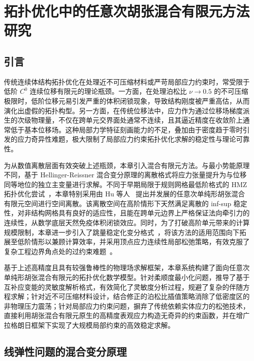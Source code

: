 \chapter{拓扑优化中的任意次胡张混合有限元方法研究}
\label{chap:hz_top}

\iffalse

\section{引言}
\label{sec:ch5_intro}

传统连续体结构拓扑优化在处理近不可压缩材料或严苛局部应力约束时，常受限于低阶 $C^0$ 连续位移有限元的理论瓶颈。一方面，在处理泊松比 $\nu \rightarrow 0.5$ 的不可压缩极限时，低阶位移元易引发严重的体积闭锁现象，导致结构刚度被严重高估，从而演化出虚假的拓扑构型。另一方面，在传统位移法中，应力作为通过位移场梯度派生的次级物理量，不仅在跨单元交界面处通常不连续，且其逼近精度在收敛阶上通常低于基本位移场。这种局部力学特征刻画能力的不足，叠加由于密度趋于零时引发的应力奇异性难题，极大限制了局部应力约束拓扑优化求解的稳定性与理论可靠性。

为从数值离散层面有效突破上述瓶颈，本章引入混合有限元方法。与最小势能原理不同，基于 Hellinger-Reissner 混合变分原理的离散格式将应力张量提升为与位移同等地位的独立主变量进行求解。不同于早期局限于规则网格最低阶格式的 HMZ 拓扑优化尝试~\cite{bruggiTopologyOptimizationMixed2016a}，本章特别采用由 Hu 等人~\cite{huFiniteElementApproximations2015} 提出并发展的任意次单纯形胡张混合有限元空间进行空间离散。该离散空间在高阶情形下天然满足离散的 inf-sup 稳定性，对非结构网格具有良好的适应性，且能在跨单元边界上严格保证法向牵引力的连续性，从数学底层天然免疫体积闭锁效应。同时，为了打破高阶单元带来的计算规模限制，本章进一步引入了跳量稳定化变分格式~\cite{chenStabilizedMixedFinite2017a}，将该方法的适用范围向下拓展至低阶情形以兼顾计算效率，并采用顶点应力连续性局部松弛策略，有效克服了复杂工程边界角点处的过约束难题~\cite{huPartialRelaxation02021a}。

基于上述高精度且具有较强鲁棒性的物理场求解框架，本章系统构建了面向任意次单纯形胡张混合有限元的拓扑优化数学模型。针对柔顺度最小化问题，推导了基于互补应变能的灵敏度解析格式，有效简化了灵敏度分析过程，规避了复杂的伴随方程求解；针对近不可压缩材料设计，结合修正的泊松比插值策略消除了低密度区的非物理压力震荡；针对局部应力约束问题，摒弃了传统依赖实体应力的松弛技术，直接利用胡张混合有限元原生的高精度表观应力构造无奇异的约束函数，并在增广拉格朗日框架下实现了大规模局部约束的高效稳定求解。


\section{线弹性问题的混合变分原理}
\label{sec:hz_variational_principle}

